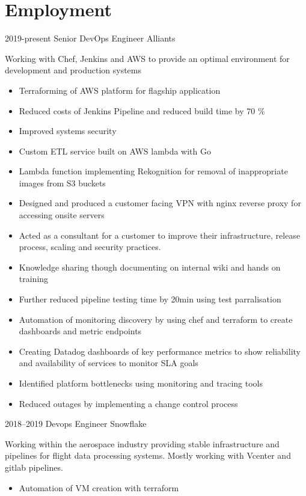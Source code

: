 \documentclass[]{friggeri-cv-a4}
\begin{document}
\section{Employment}
 \begin{entrylist}
   \entry{}
  	{2019-present}
  	{Senior DevOps Engineer}
  	{Alliants}
  	{Working with Chef, Jenkins and AWS to provide an optimal environment for development and production systems
      \begin{itemize}
        \item Terraforming of AWS platform for flagship application
        \item Reduced costs of Jenkins Pipeline and reduced build time by 70 \%
        \item Improved systems security
        \item Custom ETL service built on AWS lambda with Go
        \item Lambda function implementing Rekognition for removal of inappropriate images from S3 buckets
        \item Designed and produced a customer facing VPN with nginx reverse proxy for accessing onsite servers
        \item Acted as a consultant for a customer to improve their infrastructure, release process, scaling and security practices. 
        \item Knowledge sharing though documenting on internal wiki and hands on training
        \item Further reduced pipeline testing time by 20min using test parralisation
        \item Automation of monitoring discovery by using chef and terraform to create dashboards and metric endpoints
        \item Creating Datadog dashboards of key performance metrics to show reliability and availability of services to monitor SLA goals
        \item Identified platform bottlenecks using monitoring and tracing tools
        \item Reduced outages by implementing a change control process
      \end{itemize}}
   \entry{}
  	{2018--2019}
  	{Devops Engineer}
  	{Snowflake}
  	{
      Working within the aerospace industry providing stable infrastructure and pipelines for flight data processing systems. Mostly working with Vcenter and gitlab pipelines.
      \begin{itemize}
        \item Automation of VM creation with terraform

\end{itemize}}
\end{entrylist}
\end{document}
